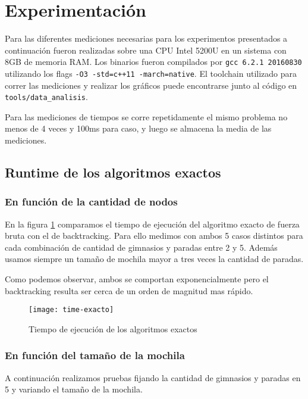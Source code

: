 \section{Experimentación}

Para las diferentes mediciones necesarias para los experimentos presentados a continuación fueron realizadas sobre una CPU Intel 5200U en un sistema con 8GB de memoria RAM. Los binarios fueron compilados por \texttt{gcc 6.2.1 20160830} utilizando los flags \texttt{-O3 -std=c++11 -march=native}. El toolchain utilizado para correr las mediciones y realizar los gráficos puede encontrarse junto al código en \texttt{tools/data_analisis}.

Para las mediciones de tiempos se corre repetidamente el mismo problema no menos de 4 veces y 100ms para caso, y luego se almacena la media de las mediciones.

\subsection{Runtime de los algoritmos exactos}

\subsubsection{En función de la cantidad de nodos}

En la figura \ref{fig:time-exacto} comparamos el tiempo de ejecución del algoritmo exacto de fuerza bruta con el de backtracking.
Para ello medimos con ambos 5 casos distintos para cada combinación de cantidad de gimnasios y paradas entre 2 y 5. Además usamos siempre un tamaño de mochila mayor a tres veces la cantidad de paradas.

Como podemos observar, ambos se comportan exponencialmente pero el backtracking resulta ser cerca de un orden de magnitud mas rápido.

\begin{figure}[H]
	\centering
	\texttt{[image: time-exacto]}
	\caption{Tiempo de ejecución de los algoritmos exactos}
	\label{fig:time-exacto}
\end{figure}

\subsubsection{En función del tamaño de la mochila}

A continuación realizamos pruebas fijando la cantidad de gimnasios y paradas en 5 y variando el tamaño de la mochila.

